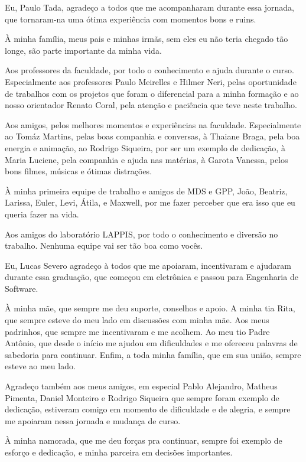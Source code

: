 \begin{agradecimentos}
\setcounter{page}{1}

Eu, Paulo Tada, agradeço a todos que me acompanharam durante essa jornada,
que tornaram-na uma ótima experiência com momentos bons e ruins.

À minha família, meus pais e minhas irmãs, sem eles eu não teria chegado tão
longe, são parte importante da minha vida.

Aos professores da faculdade, por todo o conhecimento e ajuda durante o curso. Especialmente
aos professores Paulo Meirelles e Hilmer Neri, pelas oportunidade de trabalhos com os
projetos que foram o diferencial para a minha formação e ao nosso orientador Renato Coral,
pela atenção e paciência que teve neste trabalho.

Aos amigos, pelos melhores momentos e experiências na faculdade. Especialmente
ao Tomáz Martins, pelas boas companhia e conversas, à Thaiane Braga, pela boa energia
e animação, ao Rodrigo Siqueira, por ser um exemplo de dedicação, à
Maria Luciene, pela companhia e ajuda nas matérias, à Garota Vanessa, pelos bons filmes,
músicas e ótimas distrações.

À minha primeira equipe de trabalho e amigos de MDS e GPP, João, Beatriz, Larissa, Euler,
Levi, Átila, e Maxwell, por me fazer perceber que era isso que eu queria fazer na vida.

Aos amigos do laboratório LAPPIS, por todo o conhecimento e diversão no trabalho.
Nenhuma equipe vai ser tão boa como vocês.

Eu, Lucas Severo agradeço à todos que me apoiaram, incentivaram e ajudaram
durante essa graduação, que começou em eletrônica e passou para Engenharia de 
Software.

À minha mãe, que sempre me deu suporte, conselhos e apoio. A minha tia Rita, que
sempre esteve do meu lado em discussões com minha mãe. Aos meus padrinhos, que
sempre me incentivaram e me acolhem. Ao meu tio Padre Antônio, que desde o início
me ajudou em dificuldades e me ofereceu palavras de sabedoria para continuar.
Enfim, a toda minha família, que em sua união, sempre esteve ao meu lado.

Agradeço também aos meus amigos, em especial Pablo Alejandro, Matheus Pimenta, 
Daniel Monteiro e Rodrigo Siqueira que sempre foram exemplo de dedicação, estiveram comigo em
momento de dificuldade e de alegria, e sempre me apoiaram nessa jornada e mudança
de curso.

À minha namorada, que me deu forças pra continuar, sempre foi exemplo de esforço
e dedicação, e minha parceira em decisões importantes.


\end{agradecimentos}
